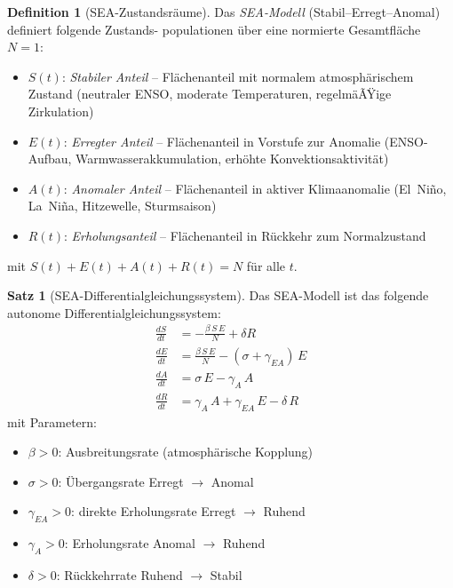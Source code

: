 ﻿\documentclass[a4paper,12pt]{article}
\theoremstyle{definition}
\newtheorem{definition}{Definition}
\newtheorem{satz}{Satz}
\begin{document}
\begin{definition}[SEA-Zustandsr\"aume]
Das \emph{SEA-Modell} (Stabil--Erregt--Anomal) definiert folgende Zustands-
populationen \"uber eine normierte Gesamtfl\"ache $N = 1$:
\begin{itemize}
    \item $S(t)$: \emph{Stabiler Anteil} -- Fl\"achenanteil mit normalem atmosph\"arischem
          Zustand (neutraler ENSO, moderate Temperaturen, regelm\"aÃŸige Zirkulation)
    \item $E(t)$: \emph{Erregter Anteil} -- Fl\"achenanteil in Vorstufe zur Anomalie
          (ENSO-Aufbau, Warmwasserakkumulation, erh\"ohte Konvektionsaktivit\"at)
    \item $A(t)$: \emph{Anomaler Anteil} -- Fl\"achenanteil in aktiver Klimaanomalie
          (El~Ni\~no, La~Ni\~na, Hitzewelle, Sturmsaison)
    \item $R(t)$: \emph{Erholungsanteil} -- Fl\"achenanteil in R\"uckkehr zum Normalzustand
\end{itemize}
mit $S(t) + E(t) + A(t) + R(t) = N$ f\"ur alle $t$.
\end{definition}

\begin{satz}[SEA-Differentialgleichungssystem]
\label{satz:sea}
Das SEA-Modell ist das folgende autonome Differentialgleichungssystem:
\begin{align}
\frac{dS}{dt} &= -\frac{\beta\, S\, E}{N} + \delta R \label{eq:dS}\\
\frac{dE}{dt} &= \frac{\beta\, S\, E}{N} - (\sigma + \gamma_{EA})\, E \label{eq:dE}\\
\frac{dA}{dt} &= \sigma\, E - \gamma_A\, A \label{eq:dA}\\
\frac{dR}{dt} &= \gamma_A\, A + \gamma_{EA}\, E - \delta\, R \label{eq:dR}
\end{align}
mit Parametern:
\begin{itemize}
    \item $\beta > 0$: Ausbreitungsrate (atmosph\"arische Kopplung)
    \item $\sigma > 0$: \"Ubergangsrate Erregt $\to$ Anomal
    \item $\gamma_{EA} > 0$: direkte Erholungsrate Erregt $\to$ Ruhend
    \item $\gamma_A > 0$: Erholungsrate Anomal $\to$ Ruhend
    \item $\delta > 0$: R\"uckkehrrate Ruhend $\to$ Stabil
\end{itemize}
\end{satz}
\end{document}
